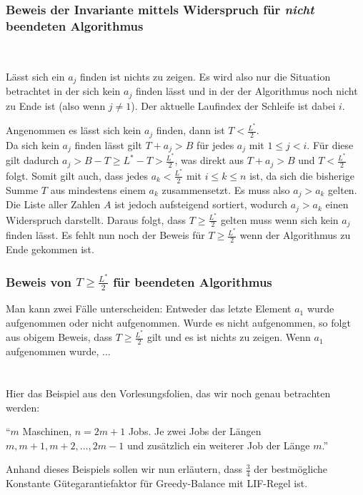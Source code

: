 \documentclass[a4paper]{article}
\begin{document}
		\subsubsection*{Beweis der Invariante mittels Widerspruch für \textit{nicht} beendeten Algorithmus}
		\vspace{-1.5\baselineskip}
		~\begin{note}
			Lässt sich ein $a_j$ finden ist nichts zu zeigen. Es wird also nur die Situation betrachtet in der sich kein $a_j$ finden lässt und in der der Algorithmus noch nicht zu Ende ist (also wenn $j\neq1$). Der aktuelle Laufindex der Schleife ist dabei $i$.
		\end{note}
		Angenommen es lässt sich kein $a_j$ finden, dann ist $T<\frac{L^*}{2}$.\\
		Da sich kein $a_j$ finden lässt gilt $T+a_j>B$ für jedes $a_j$ mit $1\leq j< i$. Für diese gilt dadurch $a_j>B-T\geq L^*-T>\frac{L^*}{2}$, was direkt aus $T+a_j>B$ und $T<\frac{L^*}{2}$ folgt. Somit gilt auch, dass jedes $a_k<\frac{L^*}{2}$ mit $i\leq k\leq n$ ist, da sich die bisherige Summe $T$ aus mindestens einem $a_k$ zusammensetzt. Es muss also $a_j>a_k$ gelten.\n
		Die Liste aller Zahlen $A$ ist jedoch aufsteigend sortiert, wodurch $a_j>a_k$ einen Widerspruch darstellt. Daraus folgt, dass $T\geq \frac{L^*}{2}$ gelten muss wenn sich kein $a_j$ finden lässt.\n
		Es fehlt nun noch der Beweis für $T\geq\frac{L^*}{2}$ wenn der Algorithmus zu Ende gekommen ist.
		\subsubsection*{Beweis von $T\geq\frac{L^*}{2}$ für beendeten Algorithmus}
		Man kann zwei Fälle unterscheiden: Entweder das letzte Element $a_1$ wurde aufgenommen oder nicht aufgenommen. Wurde es nicht aufgenommen, so folgt aus obigem Beweis, dass $T\geq \frac{L^*}{2}$ gilt und es ist nichts zu zeigen.\n
		Wenn $a_1$ aufgenommen wurde, $\dots$
		
	\section{}
	
	Hier das Beispiel aus den Vorlesungsfolien, das wir noch genau betrachten werden: \n
	
	"`$m$ Maschinen, $n = 2m + 1$ Jobs. Je zwei Jobs der Längen $m, m + 1, m + 2, \dots , 2m - 1$ und zusätzlich ein weiterer Job der Länge $m$."' \n
	
	Anhand dieses Beispiels sollen wir nun erläutern, dass $\frac{3}{4}$ der bestmögliche Konstante Gütegarantiefaktor für Greedy-Balance mit LIF-Regel ist. \n
	
\end{document}
